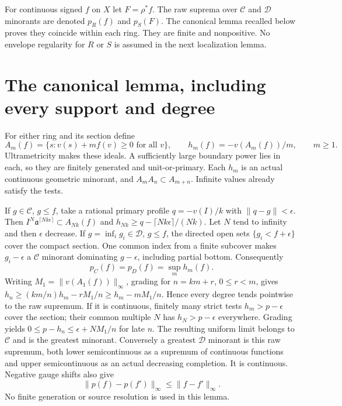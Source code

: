 \documentclass[11pt]{article}
\newcommand{\C}{\mathcal C}
\newcommand{\D}{\mathcal D}
\newcommand{\aa}{\mathfrak a}
\begin{document}
For continuous signed $f$ on $X$ let $F=\rho^*f$. The raw suprema over
$\C$ and $\D$ minorants are denoted $p_R(f)$ and $p_S(F)$.
The canonical lemma recalled below proves they coincide within each ring.
They are finite and nonpositive. No envelope regularity for $R$ or $S$
is assumed in the next localization lemma.

\section{The canonical lemma, including every support and degree}
For either ring and its section define
\[
 A_m(f)=\{s:v(s)+mf(v)\ge0\text{ for all }v\},\qquad
 h_m(f)=-v(A_m(f))/m,\qquad m\ge1.
\]
Ultrametricity makes these ideals. A sufficiently large boundary power
lies in each, so they are finitely generated and unit-or-primary.
Each $h_m$ is an actual continuous geometric minorant, and
$A_mA_n\subset A_{m+n}$. Infinite values already satisfy the tests.

If $g\in\C$, $g\le f$, take a rational primary profile
$q=-v(I)/k$ with $\|q-g\|<\epsilon$. Then
$I^N\aa^{\lceil Nk\epsilon\rceil}\subset A_{Nk}(f)$ and
$h_{Nk}\ge q-\lceil Nk\epsilon\rceil/(Nk)$.
Let $N$ tend to infinity and then $\epsilon$ decrease.
If $g=\inf_i g_i\in\D$, $g\le f$, the directed open sets
$\{g_i<f+\epsilon\}$ cover the compact section. One common index from a
finite subcover makes $g_i-\epsilon$ a $\C$ minorant dominating
$g-\epsilon$, including partial bottom. Consequently
\[
 p_C(f)=p_D(f)=\sup_m h_m(f).
\]
Writing $M_1=\|v(A_1(f))\|_\infty$, grading for $n=km+r$, $0\le r<m$,
gives $h_n\ge(km/n)h_m-rM_1/n\ge h_m-mM_1/n$.
Hence every degree tends pointwise to the raw supremum.
If it is continuous, finitely many strict tests $h_m>p-\epsilon$ cover
the section; their common multiple $N$ has $h_N>p-\epsilon$ everywhere.
Grading yields $0\le p-h_n\le\epsilon+NM_1/n$ for late $n$.
The resulting uniform limit belongs to $\C$ and is the greatest minorant.
Conversely a greatest $\D$ minorant is this raw supremum, both lower
semicontinuous as a supremum of continuous functions and upper
semicontinuous as an actual decreasing completion. It is continuous.
Negative gauge shifts also give
\[
 \|p(f)-p(f')\|_\infty\le\|f-f'\|_\infty .
\]
No finite generation or source resolution is used in this lemma.
\end{document}
